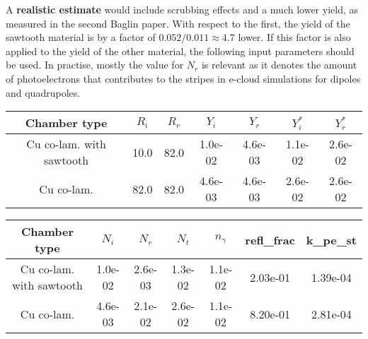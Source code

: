 A \textbf{realistic estimate} would include scrubbing effects and a much lower yield, as measured in the second Baglin paper.
With respect to the first, the yield of the sawtooth material is by a factor of $0.052/0.011 \approx 4.7$ lower.
If this factor is also applied to the yield of the other material, the following input parameters should be used.
In practise, mostly the value for $N_r$ is relevant as it denotes the amount of photoelectrons that contributes to the stripes in e-cloud simulations for dipoles and quadrupoles.

\begin{tabular}{c|cccc|cc}
Chamber type & $R_i$ & $R_r$ & $Y_i$ & $Y_r$ & $Y_i^*$ & $Y_r^*$  \\ \hline 
Cu co-lam. with sawtooth& 10.0 &82.0 &1.0e-02 &4.6e-03& 1.1e-02 &2.6e-02 \\
Cu co-lam.& 82.0 &82.0 &4.6e-03 &4.6e-03& 2.6e-02 &2.6e-02 \\
\end{tabular}

\begin{tabular}{c|ccc|c|cc}
Chamber type & $N_i$ & $N_r$ & $N_t$ & $n_\gamma$ & refl\_frac & k\_pe\_st \\ \hline 
Cu co-lam. with sawtooth& 1.0e-02 &2.6e-03 &1.3e-02 &1.1e-02 &2.03e-01 &1.39e-04\\
Cu co-lam.& 4.6e-03 &2.1e-02 &2.6e-02 &1.1e-02 &8.20e-01 &2.81e-04\\
\end{tabular}




